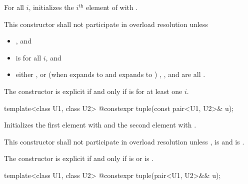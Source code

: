 \begin{itemdescr}
\pnum
\effects For all $i$,
initializes the $i^\text{th}$ element of  with
.

\pnum
\remarks This constructor shall not participate in overload resolution unless

\begin{itemize}
\item
{} \tcode{==} , and
\item
{} is  for all $i$, and
\item
either
, or
(when  expands to  and  expands to )
, ,
and  are all .
\end{itemize}
The constructor is explicit if and only if
 is 
for at least one $i$.
\end{itemdescr}

%
%
\begin{itemdecl}
template<class U1, class U2> @\EXPLICIT@ constexpr tuple(const pair<U1, U2>& u);
\end{itemdecl}

\begin{itemdescr}
\pnum
\effects Initializes the first element with  and the
second element with .

\pnum
\remarks This constructor shall not participate in overload resolution unless
,
 is  and
 is .

\pnum
The constructor is explicit if and only if
 is  or
 is .
\end{itemdescr}

%
%
\begin{itemdecl}
template<class U1, class U2> @\EXPLICIT@ constexpr tuple(pair<U1, U2>&& u);
\end{itemdecl}

